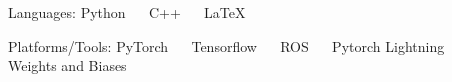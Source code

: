 



\vspace{2mm}
\begin{cvskills}

  \cvskill
    {Languages:} %
    {Python ~\cdotp~ C++ ~\cdotp~ LaTeX} %

  \cvskill
    {Platforms/Tools:} %
    { PyTorch ~\cdotp~ Tensorflow ~\cdotp~ ROS ~\cdotp~ Pytorch Lightning ~\cdotp~ Weights and Biases} %

\end{cvskills}



